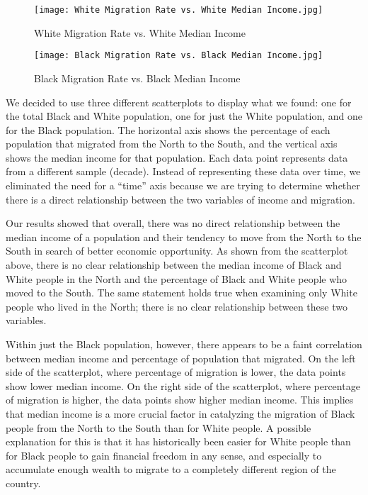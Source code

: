 \documentclass[12pt]{article}
\begin{document}
\begin{figure}
    \centering
    \texttt{[image: White Migration Rate vs. White Median Income.jpg]}
    \caption{White Migration Rate vs. White Median Income}
    \label{fig:white}
\end{figure}

\begin{figure}
    \centering
    \texttt{[image: Black Migration Rate vs. Black Median Income.jpg]}
    \caption{Black Migration Rate vs. Black Median Income}
    \label{fig:black}
\end{figure}

We decided to use three different scatterplots to display what we found: one for the total Black and White population, one for just the White population, and one for the Black population. The horizontal axis shows the percentage of each population that migrated from the North to the South, and the vertical axis shows the median income for that population. Each data point represents data from a different sample (decade). Instead of representing these data over time, we eliminated the need for a “time” axis because we are trying to determine whether there is a direct relationship between the two variables of income and migration. 

Our results showed that overall, there was no direct relationship between the median income of a population and their tendency to move from the North to the South in search of better economic opportunity. As shown from the scatterplot above, there is no clear relationship between the median income of Black and White people in the North and the percentage of Black and White people who moved to the South. The same statement holds true when examining only White people who lived in the North; there is no clear relationship between these two variables. 

Within just the Black population, however, there appears to be a faint correlation between median income and percentage of population that migrated. On the left side of the scatterplot, where percentage of migration is lower, the data points show lower median income. On the right side of the scatterplot, where percentage of migration is higher, the data points show higher median income. This implies that median income is a more crucial factor in catalyzing the migration of Black people from the North to the South than for White people. A possible explanation for this is that it has historically been easier for White people than for Black people to gain financial freedom in any sense, and especially to accumulate enough wealth to migrate to a completely different region of the country.
\end{document}
